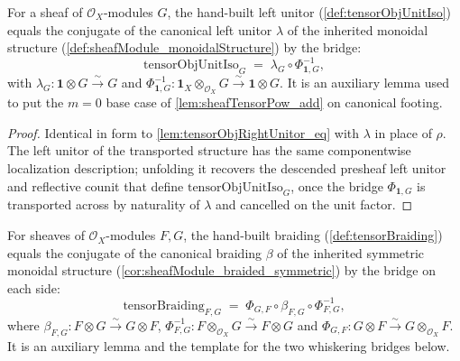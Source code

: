 \begin{lemma}

  \label{lem:tensorObjUnitIso_eq}
  For a sheaf of \(\mathcal{O}_X\)-modules \(G\), the hand-built left unitor
  (\cref{def:tensorObjUnitIso}) equals the conjugate of the canonical left unitor
  \(\lambda\) of the inherited monoidal structure
  (\cref{def:sheafModule_monoidalStructure}) by the bridge:
  \[
    \mathrm{tensorObjUnitIso}_G
      \;=\; \lambda_G \circ \Phi_{\mathbf{1},G}^{-1},
  \]
  with \(\lambda_G : \mathbf{1} \otimes G \xrightarrow{\sim} G\) and
  \(\Phi_{\mathbf{1},G}^{-1} : \mathbf{1}_X \otimes_{\mathcal{O}_X} G
  \xrightarrow{\sim} \mathbf{1} \otimes G\). It is an auxiliary lemma used to put
  the \(m = 0\) base case of \cref{lem:sheafTensorPow_add} on canonical footing.
\end{lemma}

\begin{proof}
  \leanok
  Identical in form to \cref{lem:tensorObjRightUnitor_eq} with \(\lambda\) in place
  of \(\rho\). The left unitor of the transported structure has the same
  componentwise localization description; unfolding it recovers the descended
  presheaf left unitor and reflective counit that define
  \(\mathrm{tensorObjUnitIso}_G\), once the bridge \(\Phi_{\mathbf{1},G}\) is
  transported across by naturality of \(\lambda\) and cancelled on the unit
  factor.
\end{proof}

\begin{lemma}

  \label{lem:tensorBraiding_eq}
  For sheaves of \(\mathcal{O}_X\)-modules \(F, G\), the hand-built braiding
  (\cref{def:tensorBraiding}) equals the conjugate of the canonical braiding
  \(\beta\) of the inherited symmetric monoidal structure
  (\cref{cor:sheafModule_braided_symmetric}) by the bridge on each side:
  \[
    \mathrm{tensorBraiding}_{F,G}
      \;=\; \Phi_{G,F} \circ \beta_{F,G} \circ \Phi_{F,G}^{-1},
  \]
  where \(\beta_{F,G} : F \otimes G \xrightarrow{\sim} G \otimes F\),
  \(\Phi_{F,G}^{-1} : F \otimes_{\mathcal{O}_X} G \xrightarrow{\sim} F \otimes G\)
  and \(\Phi_{G,F} : G \otimes F \xrightarrow{\sim} G \otimes_{\mathcal{O}_X} F\).
  It is an auxiliary lemma and the template for the two whiskering bridges
  below.
\end{lemma}


